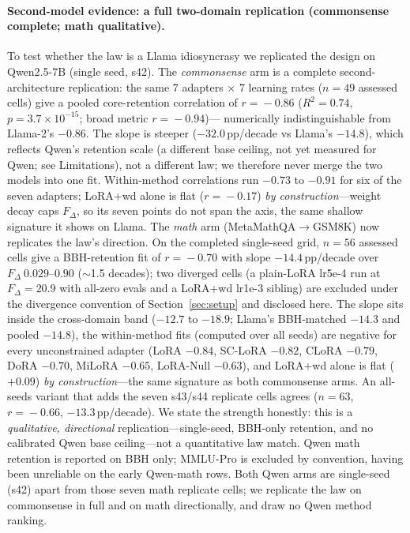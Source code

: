 \documentclass[11pt]{article}
\newcommand{\dw}{F_{\Delta}}
\begin{document}
\paragraph{Second-model evidence: a full two-domain replication (commonsense
complete; math qualitative).} To test whether
the law is a Llama idiosyncrasy we replicated the design on Qwen2.5-7B (single
seed, s42). The \emph{commonsense} arm is a complete second-architecture
replication: the same 7 adapters $\times$ 7 learning rates ($n\!=\!49$ assessed
cells) give a pooled core-retention correlation of $r\!=\!-0.86$
($R^2\!=\!0.74$, $p\!=\!3.7\!\times\!10^{-15}$; broad metric $r\!=\!-0.94$)---%
numerically indistinguishable from Llama-2's $-0.86$. The slope is steeper
($-32.0$\,pp/decade vs Llama's $-14.8$), which reflects Qwen's retention scale
(a different base ceiling, not yet measured for Qwen; see Limitations), not a
different law; we therefore never merge the
two models into one fit. Within-method correlations run $-0.73$ to $-0.91$ for
six of the seven adapters; LoRA{+}wd alone is flat ($r\!=\!-0.17$) \emph{by
construction}---weight decay caps $\dw$, so its seven points do not span the
axis, the same shallow signature it shows on Llama. The \emph{math} arm
(MetaMathQA$\rightarrow$GSM8K) now replicates the law's direction. On the
completed single-seed grid, $n\!=\!56$ assessed cells give a BBH-retention fit
of $r\!=\!-0.70$ with slope $-14.4$\,pp/decade over $\dw\ 0.029$--$0.90$
($\sim$1.5 decades); two diverged cells (a plain-LoRA lr5e-4 run at
$\dw\!=\!20.9$ with all-zero evals and a LoRA{+}wd lr1e-3 sibling) are excluded
under the divergence convention of Section~\ref{sec:setup} and disclosed here.
The slope sits inside the cross-domain band ($-12.7$ to $-18.9$; Llama's
BBH-matched $-14.3$ and pooled $-14.8$), the within-method fits (computed over
all seeds) are negative for every unconstrained adapter (LoRA $-0.84$, SC-LoRA
$-0.82$, CLoRA $-0.79$, DoRA $-0.70$, MiLoRA $-0.65$, LoRA-Null $-0.63$), and
LoRA{+}wd alone is flat ($+0.09$) \emph{by construction}---the same signature
as both commonsense arms. An all-seeds variant that adds the seven s43/s44
replicate cells agrees ($n\!=\!63$, $r\!=\!-0.66$, $-13.3$\,pp/decade). We
state the strength honestly: this is a \emph{qualitative, directional}
replication---single-seed, BBH-only retention, and no calibrated Qwen base
ceiling---not a quantitative law match. Qwen math retention is reported on BBH
only; MMLU-Pro is excluded by convention, having been unreliable on the early
Qwen-math rows. Both Qwen arms are single-seed (s42) apart from those seven
math replicate cells; we replicate the law on commonsense in full and on math
directionally, and draw no Qwen method ranking.
\end{document}
